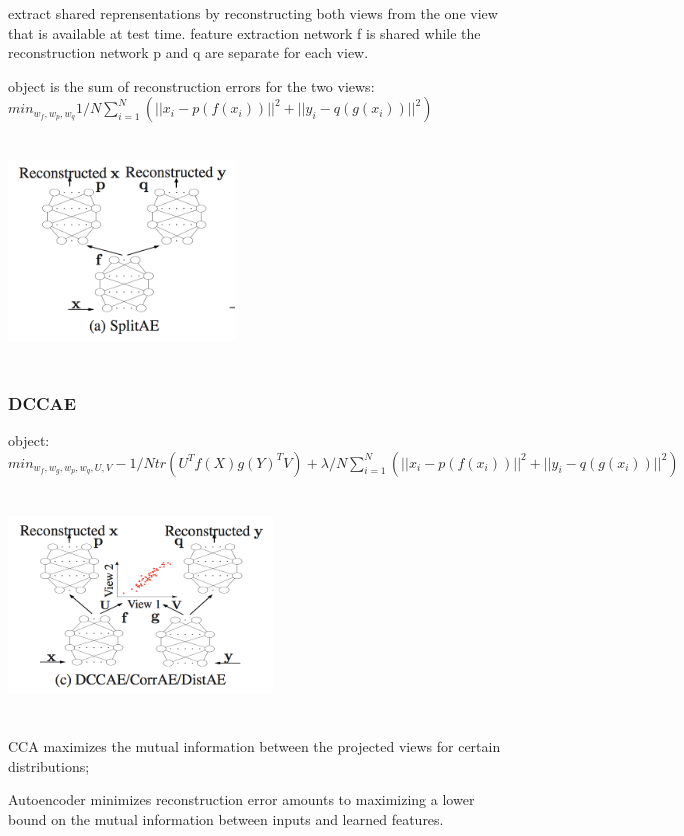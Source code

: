 \documentclass[a4paper]{article}
\begin{document}
extract shared reprensentations by reconstructing both views from the one view that is available at test time. feature extraction network f is shared while the reconstruction network p and q are separate for each view.

object is the sum of reconstruction errors for the two views:
$min_{w_f,w_p,w_q} 1/N \sum_{i=1}^N (||x_i - p(f(x_i))||^2 + ||y_i-q(g(x_i))||^2)$

\begin{center}
\includegraphics[width=6cm, height=6cm]{splitae.png}
\end{center}

\subsubsection{DCCAE}

object:
$min_{w_f,w_g,w_p,w_q,U,V} -1/N tr(U^Tf(X)g(Y)^TV) + \lambda/N \sum_{i=1}^N (||x_i - p(f(x_i))||^2 + ||y_i-q(g(x_i))||^2)$

\begin{center}
\includegraphics[width=7cm, height=6cm]{dccae.png}
\end{center}

CCA maximizes the mutual information between the projected views for certain distributions;

Autoencoder minimizes reconstruction error amounts to maximizing a lower bound on the mutual information between inputs and learned features.
\end{document}
